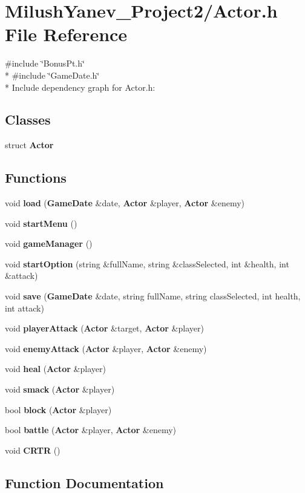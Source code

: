 \section{Milush\+Yanev\+\_\+\+Project2/\+Actor.h File Reference}
\label{_actor_8h}
{\ttfamily \#include \char`\"{}Bonus\+Pt.\+h\char`\"{}}\\*
{\ttfamily \#include \char`\"{}Game\+Date.\+h\char`\"{}}\\*
Include dependency graph for Actor.\+h\+:
\subsection*{Classes}
\begin{DoxyCompactItemize}
\item 
struct {\bf Actor}
\end{DoxyCompactItemize}
\subsection*{Functions}
\begin{DoxyCompactItemize}
\item 
void {\bf load} ({\bf Game\+Date} \&date, {\bf Actor} \&player, {\bf Actor} \&enemy)
\item 
void {\bf start\+Menu} ()
\item 
void {\bf game\+Manager} ()
\item 
void {\bf start\+Option} (string \&full\+Name, string \&class\+Selected, int \&health, int \&attack)
\item 
void {\bf save} ({\bf Game\+Date} \&date, string full\+Name, string class\+Selected, int health, int attack)
\item 
void {\bf player\+Attack} ({\bf Actor} \&target, {\bf Actor} \&player)
\item 
void {\bf enemy\+Attack} ({\bf Actor} \&player, {\bf Actor} \&enemy)
\item 
void {\bf heal} ({\bf Actor} \&player)
\item 
void {\bf smack} ({\bf Actor} \&player)
\item 
bool {\bf block} ({\bf Actor} \&player)
\item 
bool {\bf battle} ({\bf Actor} \&player, {\bf Actor} \&enemy)
\item 
void {\bf C\+R\+T\+R} ()
\end{DoxyCompactItemize}


\subsection{Function Documentation}
